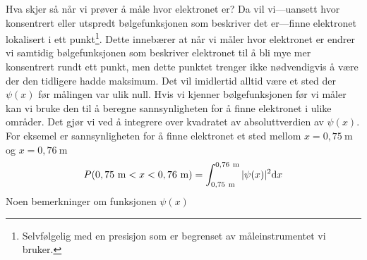 Hva skjer så når vi prøver å måle hvor elektronet er? Da vil vi---uansett hvor konsentrert eller utspredt bølgefunksjonen som beskriver det er---finne elektronet lokalisert i ett punkt\footnote{Selvfølgelig med en presisjon som er begrenset av måleinstrumentet vi bruker.}. Dette innebærer at når vi måler hvor elektronet er endrer vi samtidig bølgefunksjonen som beskriver elektronet til å bli mye mer konsentrert rundt ett punkt, men dette punktet trenger ikke nødvendigvis å være der den tidligere hadde maksimum. Det vil imidlertid alltid være et sted der $\psi(x)$ før målingen var ulik null. Hvis vi kjenner bølgefunksjonen før vi måler kan vi bruke den til å beregne sannsynligheten for å finne elektronet i ulike områder. Det gjør vi ved å integrere over kvadratet av absoluttverdien av $\psi(x)$. For eksemel er sannsynligheten for å finne elektronet et sted mellom $x=0,75~\mathrm{m}$ og $x=0,76~\mathrm{m}$
\begin{equation}
	P ( 0,75~\mathrm{m}<x<0,76~\mathrm{m}) = \int_{0,75~\mathrm{m}}^{0,76~\mathrm{m}}|\psi(x)|^2\text{d} x
	\label{eq:kvante:prob}
\end{equation}
Noen bemerkninger om funksjonen $\psi(x)$
